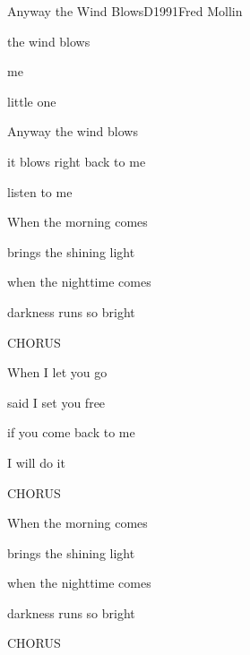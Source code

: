 \documentclass[a4paper,draft]{book}
\begin{document}
\begin{song}{Anyway the Wind Blows}{D}{1991}{Fred Mollin}{}{}
 
  \begin{SBChorus}
     the wind blows 
    
     me
    
    little one

    Anyway the wind blows
    
    it blows right back to me
    
    listen to me
  \end{SBChorus}

	\begin{SBVerse}
  When the morning comes
  
  brings the shining light
  
  when the nighttime comes
  
  darkness runs so bright
	\end{SBVerse}

  \begin{SBChorus}
    CHORUS
  \end{SBChorus}

	\begin{SBVerse}
  When I let you go

  said I set you free

  if you come back to me

  I will do it
	\end{SBVerse}

  \begin{SBChorus}
    CHORUS
  \end{SBChorus}

	\begin{SBVerse}
  When the morning comes

  brings the shining light

  when the nighttime comes

  darkness runs so bright
	\end{SBVerse}

  \begin{SBChorus}
    CHORUS
  \end{SBChorus}

\end{song}
\end{document}
